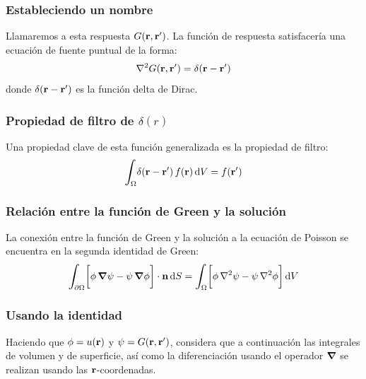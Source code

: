 \documentclass[12pt]{beamer}
\begin{document}
\begin{frame}
\frametitle{Estableciendo un nombre}
Llamaremos a esta respuesta $G(\vb{r}, \vb{\ensuremath{{r}^{\prime}}})$. \pause La función de respuesta satisfacería una ecuación de fuente puntual de la forma:
\pause
\begin{align*}
\laplacian G(\vb{r}, \vb{\pderivada{r}}) = \delta (\vb{r} - \vb{\pderivada{r}})
\end{align*}
donde $\delta (\vb{r} - \vb{\ensuremath{{r}^{\prime}}})$ es la función delta de Dirac.
\end{frame}

\begin{frame}
\frametitle{Propiedad de filtro de $\delta (r)$}
Una propiedad clave de esta función generalizada es la propiedad de filtro:
\pause
\begin{align*}
\scaleint{6ex}_{\bs \Omega} \delta (\vb{r} - \vb{\pderivada{r}}) \, f (\vb{r}) \dd{V} = f (\vb{\pderivada{r}})
\end{align*}
\end{frame}

\begin{frame}
\frametitle{Relación entre la función de Green y la solución}
La conexión entre la función de Green y la solución a la ecuación de Poisson se encuentra en la segunda identidad de Green:
\pause
\begin{align*}
\scaleint{6ex}_{\bs \partial \Omega} \bigg[ \phi \, \grad{\psi} - \psi \, \grad{\phi} \bigg] \cdot \vb{n} \dd{S} = \scaleint{6ex}_{\bs \Omega} \bigg[ \phi \, \laplacian{\psi} - \psi \, \laplacian{\phi} \bigg] \dd{V}
\end{align*}
\end{frame}

\begin{frame}
\frametitle{Usando la identidad}
Haciendo que $\phi = u (\vb{r})$ y $\psi = G (\vb{r}, \vb{\ensuremath{{r}^{\prime}}})$, \pause considera que a continuación las integrales de volumen y de superficie, así como la diferenciación usando el operador $\grad$ se realizan usando las $\vb{r}$-coordenadas.
\end{frame}
\end{document}
